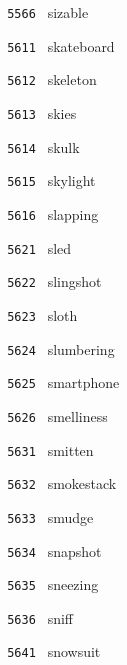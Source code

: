 \documentclass[11pt]{article}
\begin{document}
\begin{multicols}{6}
\noindent \texttt{ 5566 } \hspace{1mm} sizable  \par
\noindent \texttt{ 5611 } \hspace{1mm} skateboard  \par
\noindent \texttt{ 5612 } \hspace{1mm} skeleton  \par
\noindent \texttt{ 5613 } \hspace{1mm} skies  \par
\noindent \texttt{ 5614 } \hspace{1mm} skulk  \par
\noindent \texttt{ 5615 } \hspace{1mm} skylight  \par
\noindent \texttt{ 5616 } \hspace{1mm} slapping  \par
\noindent \texttt{ 5621 } \hspace{1mm} sled  \par
\noindent \texttt{ 5622 } \hspace{1mm} slingshot  \par
\noindent \texttt{ 5623 } \hspace{1mm} sloth  \par
\noindent \texttt{ 5624 } \hspace{1mm} slumbering  \par
\noindent \texttt{ 5625 } \hspace{1mm} smartphone  \par
\noindent \texttt{ 5626 } \hspace{1mm} smelliness  \par
\noindent \texttt{ 5631 } \hspace{1mm} smitten  \par
\noindent \texttt{ 5632 } \hspace{1mm} smokestack  \par
\noindent \texttt{ 5633 } \hspace{1mm} smudge  \par
\noindent \texttt{ 5634 } \hspace{1mm} snapshot  \par
\noindent \texttt{ 5635 } \hspace{1mm} sneezing  \par
\noindent \texttt{ 5636 } \hspace{1mm} sniff  \par
\noindent \texttt{ 5641 } \hspace{1mm} snowsuit  \par

\end{multicols}
\end{document}
